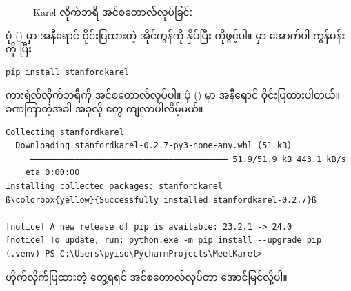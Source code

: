 \begin{figure}[tb!]
\caption{Karel လိုက်ဘရီ အင်စတောလ်လုပ်ခြင်း} 
\label{fig:install_karel}
\end{figure}
ပုံ (\fRefNo{\ref{fig:install_karel}}) မှာ အနီရောင် ဝိုင်းပြထားတဲ့ အိုင်ကွန်ကို နှိပ်ပြီး  ကိုဖွင့်ပါ။  မှာ အောက်ပါ ကွန်မန်းကို  ပြီး 
%
\begin{verbatim}
pip install stanfordkarel
\end{verbatim}
%
ကားရဲလ်လိုက်ဘရီကို အင်စတောလ်လုပ်ပါ။ ပုံ (\fRefNo{\ref{fig:install_karel}}) မှာ  အနီရောင် ဝိုင်းပြထားပါတယ်။ ခဏကြာတဲ့အခါ အခုလို တွေ ကျလာပါလိမ့်မယ်။ 

%
\begin{verbatim}
Collecting stanfordkarel
  Downloading stanfordkarel-0.2.7-py3-none-any.whl (51 kB)
     ━━━━━━━━━━━━━━━━━━━━━━━━━━━━━━━━━━━━━━━━ 51.9/51.9 kB 443.1 kB/s 
    eta 0:00:00
Installing collected packages: stanfordkarel
ß\colorbox{yellow}{Successfully installed stanfordkarel-0.2.7}ß

[notice] A new release of pip is available: 23.2.1 -> 24.0
[notice] To update, run: python.exe -m pip install --upgrade pip
(.venv) PS C:\Users\pyiso\PycharmProjects\MeetKarel>
\end{verbatim}
%
ဟိုက်လိုက်ပြထားတဲ့  တွေ့ရရင် အင်စတောလ်လုပ်တာ အောင်မြင်လို့ပါ။

